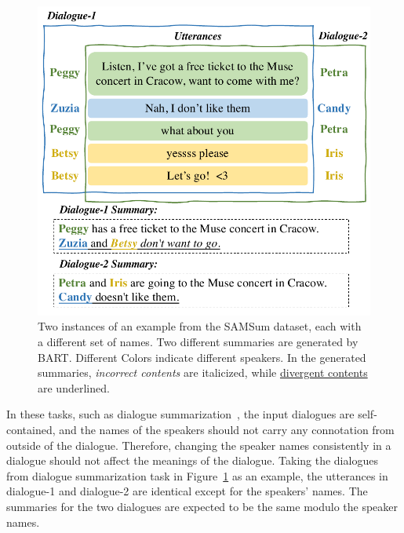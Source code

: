 \begin{figure}[th]
	\centering
	\includegraphics[width=0.95\columnwidth]{example.pdf}
	\caption{Two instances of an example from the SAMSum dataset, each
with a different set of names. Two different summaries are generated by BART. 
Different Colors indicate different speakers. 
In the generated summaries, \textit{incorrect contents} are italicized, 
while \underline{divergent contents} are underlined.}
	\label{fig:example}
\end{figure}

In these tasks, such as dialogue summarization~\cite{lin2022other,zhong2022dialoglm}, the input dialogues are self-contained, and the names of the speakers
should not carry any connotation from outside of the dialogue. Therefore,
changing the speaker names consistently in a dialogue should not affect the 
meanings of the dialogue.
Taking the dialogues from dialogue summarization task in 
Figure~\ref{fig:example} as an example, the utterances in dialogue-1 and
dialogue-2 are identical except for the speakers' names. 
The summaries for the two dialogues are expected to be the same modulo 
the speaker names. 

